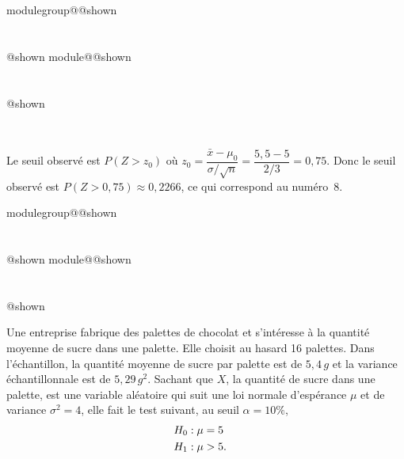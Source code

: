 \documentclass{Evaluation}
\makeatletter
\newcommand{\currentmodulekey}{}
\newcommand{\currentmoduletitle}{}
\newcommand{\currentgroupkey}{}
\newcommand{\currentgrouptitle}{}
\newcommand{\showmoduleifneeded}{%
  \ifx\currentgroupkey\empty\else
    \expandafter\ifx\csname modulegroup@\currentgroupkey @shown\endcsname\relax
      \section*{\currentgrouptitle}%
      \expandafter\gdef\csname modulegroup@\currentgroupkey @shown\endcsname{1}%
    \fi
  \fi
  \expandafter\ifx\csname module@\currentmodulekey @shown\endcsname\relax
    \section*{\currentmoduletitle}%
    \expandafter\gdef\csname module@\currentmodulekey @shown\endcsname{1}%
  \fi
}
\newenvironment{A23}{\showmoduleifneeded}{}
\makeatother
\begin{document}
\begin{questions}
\begin{A23}
\begin{parts}
  \begin{oneparcheckboxes}
      \hspace{0.061cm}
      \hspace{0.061cm}
      \hspace{0.061cm}
      \hspace{0.061cm}
      \hspace{0.061cm}
      \hspace{0.061cm}
      \\
 \end{oneparcheckboxes}

\begin{solution}
Le seuil observé est $P(Z > z_0)$ où $z_0 = \dfrac{\bar{x} - \mu_0}{\sigma/\sqrt{n}} = \dfrac{5{,}5 - 5}{2/3} = 0{,}75$. Donc le seuil observé est $P(Z > 0{,}75) \approx 0{,}2266$, ce qui correspond au numéro~8.
\end{solution}


\end{parts}
\end{A23}

\begin{A23}
\question {} %
Une entreprise fabrique des palettes de chocolat et s'intéresse à la quantité moyenne de sucre dans une palette. Elle choisit au hasard 16 palettes. Dans l'échantillon, la quantité moyenne de sucre par palette est de $5,4 \,g$ et la variance échantillonnale est de $5,29 \, g^2$. Sachant que $X$, la quantité de sucre dans une palette, est une variable aléatoire qui suit une loi normale d'espérance $\mu$ et de variance $\sigma^2=4$, elle fait le test suivant, au seuil $\alpha=10\%$,
\begin{align*}
	H_0 &: \mu = 5 \cr
	H_1 &: \mu > 5.
\end{align*}

\end{A23}
\end{questions}
\end{document}
